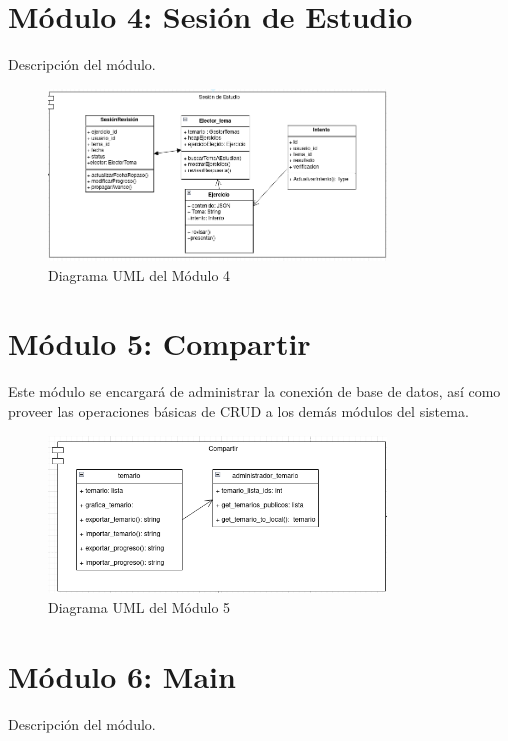 \documentclass{report}
\begin{document}
\section{Módulo 4: Sesión de Estudio}
Descripción del módulo.

\begin{figure}[H]
    \centering
    \includegraphics[width=0.8\textwidth]{./Diagramas/Modulo4.png}
    \caption{Diagrama UML del Módulo 4}
\end{figure}

\section{Módulo 5: Compartir}
Este módulo se encargará de administrar la conexión de base de datos, así como proveer las operaciones básicas de CRUD a los demás módulos del sistema.

\begin{figure}[H]
    \centering
    \includegraphics[width=0.8\textwidth]{./Diagramas/Modulo6.png}
    \caption{Diagrama UML del Módulo 5}
\end{figure}

\section{Módulo 6: Main}
Descripción del módulo.
\end{document}
